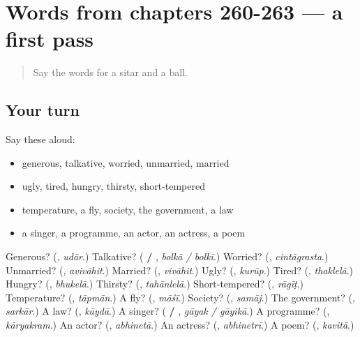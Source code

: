 \section[(dialogue)]{Words from chapters 260-263 — a first pass}

\label{lesson:MR-R268-first-pass-words-from-chapters-260-263}



\begin{quote}
Say the words for a sitar and a ball.
\end{quote}

\subsection*{Your turn}
Say these aloud:

\begin{itemize}
\raggedright
  \item generous, talkative, worried, unmarried, married
  \item ugly, tired, hungry, thirsty, short-tempered
  \item temperature, a fly, society, the government, a law
  \item a singer, a programme, an actor, an actress, a poem
\end{itemize}

\begin{tcolorbox}[breakable,colback=teal!4,colframe=teal!35!black,title={Before you move on}]
Generous? (\textbf{}, \emph{udār}.) Talkative? (\textbf{ / }, \emph{bolkā / bolkī}.) Worried? (\textbf{}, \emph{cintāgrasta}.) Unmarried? (\textbf{}, \emph{avivāhit}.) Married? (\textbf{}, \emph{vivāhit}.) Ugly? (\textbf{}, \emph{kurūp}.) Tired? (\textbf{}, \emph{thaklelā}.) Hungry? (\textbf{}, \emph{bhukelā}.) Thirsty? (\textbf{}, \emph{tahānlelā}.) Short-tempered? (\textbf{}, \emph{rāgīṭ}.) Temperature? (\textbf{}, \emph{tāpmān}.) A fly? (\textbf{}, \emph{māśī}.) Society? (\textbf{}, \emph{samāj}.) The government? (\textbf{}, \emph{sarkār}.) A law? (\textbf{}, \emph{kāydā}.) A singer? (\textbf{ / }, \emph{gāyak / gāyikā}.) A programme? (\textbf{}, \emph{kāryakram}.) An actor? (\textbf{}, \emph{abhinetā}.) An actress? (\textbf{}, \emph{abhinetrī}.) A poem? (\textbf{}, \emph{kavitā}.)
\end{tcolorbox}
